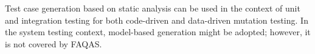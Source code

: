
Test case generation based on static analysis can be used in the context of unit and integration testing for both code-driven and data-driven mutation testing. In the system testing context, model-based generation might be adopted; however, it is not covered by FAQAS.


\ENDCHANGEDWPT
